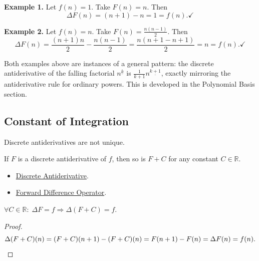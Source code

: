\textbf{Example 1.} Let \(f(n) = 1\). Take \(F(n) = n\). Then
\[
\Delta F(n) = (n+1) - n = 1 = f(n). \checkmark
\]

\textbf{Example 2.} Let \(f(n) = n\). Take \(F(n) = \tfrac{n(n-1)}{2}\). Then
\[
\Delta F(n)
= \frac{(n+1)n}{2} - \frac{n(n-1)}{2}
= \frac{n(n+1-n+1)}{2}
= n = f(n). \checkmark
\]

\begin{remark*}
Both examples above are instances of a general pattern: the discrete
antiderivative of the falling factorial \(n^{\underline{k}}\) is
\(\tfrac{1}{k+1}n^{\underline{k+1}}\), exactly mirroring the antiderivative
rule for ordinary powers. This is developed in the Polynomial Basis section.
\end{remark*}

\subsection*{Constant of Integration}

Discrete antiderivatives are not unique.

\begin{proposition}
\label{prop:constant-of-integration}
If \(F\) is a discrete antiderivative of \(f\), then so is \(F + C\)
for any constant \(C \in \mathbb{R}\).
\end{proposition}

\begin{dependencies}
\begin{itemize}
  \item \hyperref[def:discrete-antiderivative]{Discrete Antiderivative}.
  \item \hyperref[def:forward-difference]{Forward Difference Operator}.
\end{itemize}
\end{dependencies}

\begin{remark*}
\(\forall C \in \mathbb{R}:\;
\Delta F = f \Rightarrow \Delta(F+C) = f\).
\end{remark*}

\begin{proof}
\[
\Delta(F+C)(n) = (F+C)(n+1) - (F+C)(n)
= F(n+1)-F(n) = \Delta F(n) = f(n). \qedhere
\]
\end{proof}

